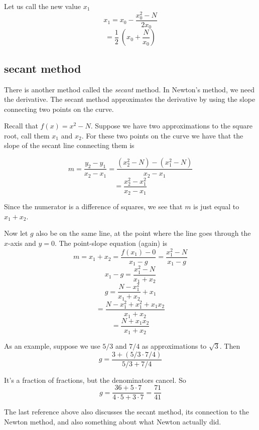\documentclass[11pt, oneside]{article}
\begin{document}
Let us call the new value $x_1$
\[ x_1 = x_0 -\frac{x_0^2 - N}{2x_0} \]
\[ = \frac{1}{2} \ (x_0 + \frac{N}{x_0}) \]

\subsection*{secant method}

There is another method called the \emph{secant} method.  In Newton's method, we need the derivative.  The secant method approximates the derivative by using the slope connecting two points on the curve.

Recall that $f(x) = x^2 - N$.  Suppose we have two approximations to the square root, call them $x_1$ and $x_2$.  For these two points on the curve we have that the slope of the secant line connecting them is

\[ m = \frac{y_2 - y_1}{x_2 - x_1} = \frac{(x_2^2 - N) - (x_1^2 - N)}{x_2 - x_1} \]
\[ = \frac{x_2^2 - x_1^2}{x_2 - x_1} \]

Since the numerator is a difference of squares, we see that $m$ is just equal to $x_1 + x_2$.

Now let $g$ also be on the same line, at the point where the line goes through the $x$-axis and $y = 0$.  The point-slope equation (again) is
\[ m = x_1 + x_2 = \frac{f(x_1) - 0}{x_1 - g} = \frac{x_1^2 - N}{x_1 - g} \]
\[ x_1 - g = \frac{x_1^2 - N}{x_1 + x_2} \]
\[ g = \frac{N - x_1^2}{x_1 + x_2} + x_1 \]
\[ = \frac{N - x_1^2 + x_1^2 + x_1x_2}{x_1 + x_2} \]
\[ = \frac{N + x_1x_2}{x_1 + x_2} \]

As an example, suppose we use $5/3$ and $7/4$ as approximations to $\sqrt{3}$.  Then
\[ g = \frac{3 + (5/3 \cdot 7/4)} {5/3 + 7/4} \]

It's a fraction of fractions, but the denominators cancel.  So
\[ g = \frac{36 + 5 \cdot 7}{4 \cdot 5 + 3 \cdot 7} = \frac{71}{41} \]

The last reference above also discusses the secant method, its connection to the Newton method, and also something about what Newton actually did.
\end{document}
